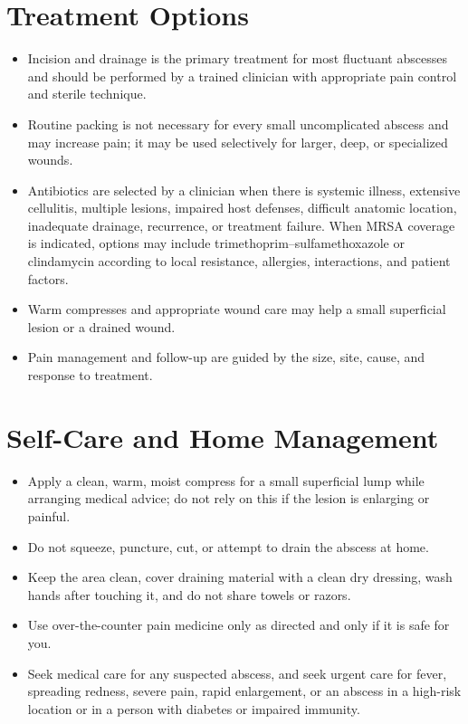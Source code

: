 \section*{Treatment Options}
\begin{itemize}
\item Incision and drainage is the primary treatment for most fluctuant abscesses and should be performed by a trained clinician with appropriate pain control and sterile technique.
\item Routine packing is not necessary for every small uncomplicated abscess and may increase pain; it may be used selectively for larger, deep, or specialized wounds.
\item Antibiotics are selected by a clinician when there is systemic illness, extensive cellulitis, multiple lesions, impaired host defenses, difficult anatomic location, inadequate drainage, recurrence, or treatment failure. When MRSA coverage is indicated, options may include trimethoprim--sulfamethoxazole or clindamycin according to local resistance, allergies, interactions, and patient factors.
\item Warm compresses and appropriate wound care may help a small superficial lesion or a drained wound.
\item Pain management and follow-up are guided by the size, site, cause, and response to treatment.
\end{itemize}

\section*{Self-Care and Home Management}
\begin{itemize}
\item Apply a clean, warm, moist compress for a small superficial lump while arranging medical advice; do not rely on this if the lesion is enlarging or painful.
\item Do not squeeze, puncture, cut, or attempt to drain the abscess at home.
\item Keep the area clean, cover draining material with a clean dry dressing, wash hands after touching it, and do not share towels or razors.
\item Use over-the-counter pain medicine only as directed and only if it is safe for you.
\item Seek medical care for any suspected abscess, and seek urgent care for fever, spreading redness, severe pain, rapid enlargement, or an abscess in a high-risk location or in a person with diabetes or impaired immunity.
\end{itemize}

